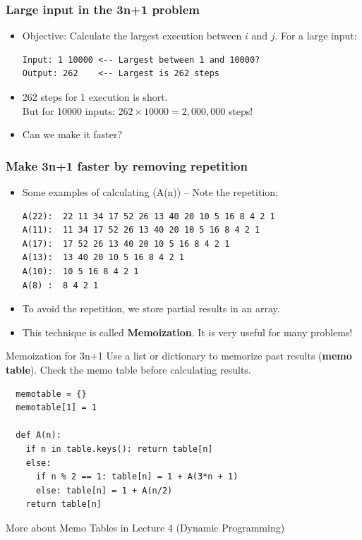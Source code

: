 \begin{frame}[fragile]
  \frametitle{Large input in the 3n+1 problem}

    \begin{itemize}
      \item Objective: Calculate the largest execution between $i$ and $j$. For a large input:
    \begin{verbatim}
Input: 1 10000 <-- Largest between 1 and 10000?
Output: 262    <-- Largest is 262 steps
    \end{verbatim}

      \item 262 steps for 1 execution is short.\\
      But for 10000 inputs: $262\times10000 = 2,000,000$ steps!\medskip

      \item Can we make it faster?


    \end{itemize}
\end{frame}

\begin{frame}[fragile]
  \frametitle{Make 3n+1 faster by removing repetition}

  \begin{itemize}
    \item Some examples of calculating (A(n)) -- Note the repetition:
\begin{verbatim}
A(22):  22 11 34 17 52 26 13 40 20 10 5 16 8 4 2 1
A(11):  11 34 17 52 26 13 40 20 10 5 16 8 4 2 1
A(17):  17 52 26 13 40 20 10 5 16 8 4 2 1
A(13):  13 40 20 10 5 16 8 4 2 1
A(10):  10 5 16 8 4 2 1
A(8) :  8 4 2 1
\end{verbatim}\medskip

    \item To avoid the repetition, \alert{we store partial results in an array}.
    \medskip

    \item This technique is called {\bf Memoization}. It is very useful for many problems!
  \end{itemize}

\end{frame}

\begin{frame}[fragile]{Memoization for 3n+1}
  Use a list or dictionary to memorize past results ({\bf memo table}). Check the memo table before calculating results.
\begin{verbatim}
  memotable = {}
  memotable[1] = 1

  def A(n):
    if n in table.keys(): return table[n]
    else:
      if n % 2 == 1: table[n] = 1 + A(3*n + 1)
      else: table[n] = 1 + A(n/2)
    return table[n]
\end{verbatim}
More about Memo Tables in Lecture 4 (Dynamic Programming)
\end{frame}


